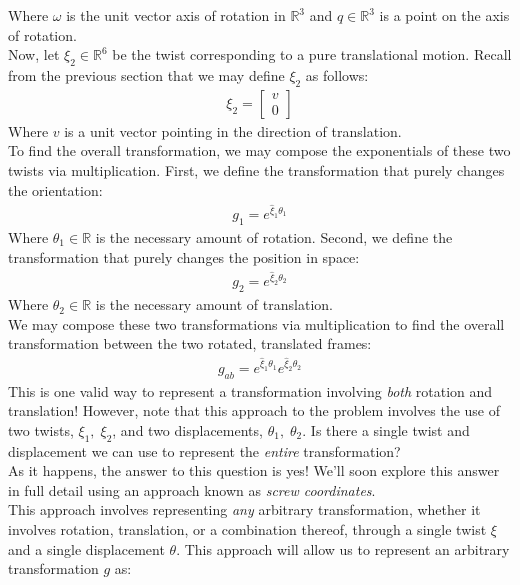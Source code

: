 \documentclass[oneside]{book}
\begin{document}
Where $\omega$ is the unit vector axis of rotation in $\mathbb{R}^3$ and $q \in \mathbb{R}^3$ is a point on the axis of rotation.\\
Now, let $\xi_2 \in \mathbb{R}^6$ be the twist corresponding to a pure translational motion. Recall from the previous section that we may define $\xi_2$ as follows:
\begin{align}
    \xi_2 = 
    \begin{bmatrix}
        v\\
        0
    \end{bmatrix}
\end{align}
Where $v$ is a unit vector pointing in the direction of translation.\\
To find the overall transformation, we may compose the exponentials of these two twists via multiplication. First, we define the transformation that purely changes the orientation:
\begin{align}
    g_1 = e^{\hat\xi_1 \theta_1}
\end{align}
Where $\theta_1 \in \mathbb{R}$ is the necessary amount of rotation. Second, we define the transformation that purely changes the position in space:
\begin{align}
    g_2 = e^{\hat\xi_2 \theta_2}
\end{align}
Where $\theta_2 \in \mathbb{R}$ is the necessary amount of translation.\\
We may compose these two transformations via multiplication to find the overall transformation between the two rotated, translated frames:
\begin{align}
    g_{ab} = e^{\hat\xi_1 \theta_1}e^{\hat\xi_2 \theta_2}
\end{align}
This is one valid way to represent a transformation involving \textit{both} rotation and translation! However, note that this approach to the problem involves the use of two twists, $\xi_1, \; \xi_2$, and two displacements, $\theta_1,\; \theta_2$. Is there a single twist and displacement we can use to represent the \textit{entire} transformation?\\
As it happens, the answer to this question is yes! We'll soon explore this answer in full detail using an approach known as \textit{screw coordinates}.\\
This approach involves representing \textit{any} arbitrary transformation, whether it involves rotation, translation, or a combination thereof, through a single twist $\xi$ and a single displacement $\theta$. This approach will allow us to represent an arbitrary transformation $g$ as:
\end{document}
